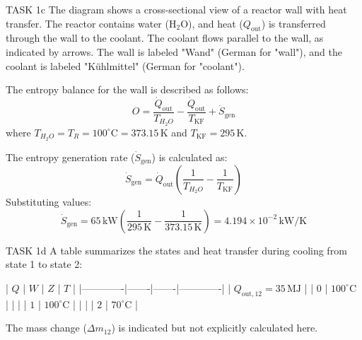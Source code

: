 TASK 1c  
The diagram shows a cross-sectional view of a reactor wall with heat transfer. The reactor contains water (H\(_2\)O), and heat (\(Q_{\text{out}}\)) is transferred through the wall to the coolant. The coolant flows parallel to the wall, as indicated by arrows. The wall is labeled "Wand" (German for "wall"), and the coolant is labeled "Kühlmittel" (German for "coolant").  

The entropy balance for the wall is described as follows:  
\[
O = \frac{\dot{Q}_{\text{out}}}{T_{H_2O}} - \frac{\dot{Q}_{\text{out}}}{T_{\text{KF}}} + \dot{S}_{\text{gen}}
\]
where \(T_{H_2O} = T_R = 100^\circ\text{C} = 373.15 \, \text{K}\) and \(T_{\text{KF}} = 295 \, \text{K}\).  

The entropy generation rate (\(\dot{S}_{\text{gen}}\)) is calculated as:  
\[
\dot{S}_{\text{gen}} = \dot{Q}_{\text{out}} \left( \frac{1}{T_{H_2O}} - \frac{1}{T_{\text{KF}}} \right)
\]
Substituting values:  
\[
\dot{S}_{\text{gen}} = 65 \, \text{kW} \left( \frac{1}{295 \, \text{K}} - \frac{1}{373.15 \, \text{K}} \right) = 4.194 \times 10^{-2} \, \text{kW/K}
\]

TASK 1d  
A table summarizes the states and heat transfer during cooling from state 1 to state 2:  

| \(Q\)       | \(W\) | \(Z\) | \(T\)       |  
|-------------|-------|-------|-------------|  
| \(Q_{\text{out},12} = 35 \, \text{MJ}\) |       | \(0\)   | \(100^\circ\text{C}\) |  
|             |       | \(1\)   | \(100^\circ\text{C}\) |  
|             |       | \(2\)   | \(70^\circ\text{C}\)  |  

The mass change (\(\Delta m_{12}\)) is indicated but not explicitly calculated here.